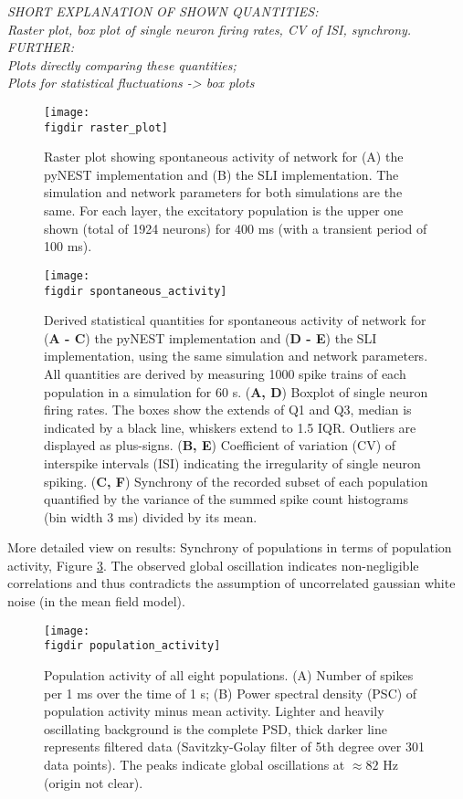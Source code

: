 \emph{SHORT EXPLANATION OF SHOWN QUANTITIES:\\
Raster plot, box plot of single neuron firing rates, CV of ISI, synchrony.\\
FURTHER: \\
Plots directly comparing these quantities;\\
Plots for statistical fluctuations -> box plots} 
\begin{figure}[htpb]
    \centering
    \texttt{[image: \\figdir raster\_plot]}
    \caption{Raster plot showing spontaneous activity of network for 
        (A) the pyNEST implementation and (B) the SLI implementation.
        The simulation and network parameters for both simulations are 
        the same. 
        For each layer, the excitatory population is the upper one shown 
        (total of 1924 neurons) for $400$ ms (with a transient period of 100 ms). 
    }
    \label{fig:raster_plot}
\end{figure}
\begin{figure}[htpb]
    \centering
    \texttt{[image: \\figdir spontaneous\_activity]}
    \caption{
        Derived statistical quantities for spontaneous activity of network for
        (\textbf{A - C}) the pyNEST implementation and (\textbf{D - E}) the SLI implementation, 
        using the same simulation and network parameters.
        All quantities are derived by measuring 1000 spike trains of
        each population in a simulation for 60 s. 
        \quad (\textbf{A, D}) Boxplot of single neuron firing rates. The boxes show the extends of 
        Q1 and Q3, median is indicated by a black line, whiskers extend to 1.5 IQR. 
        Outliers are displayed as plus-signs. 
        \quad (\textbf{B, E}) Coefficient of variation (CV) of interspike intervals (ISI) indicating 
        the irregularity of single neuron spiking. 
        \quad (\textbf{C, F}) Synchrony of the recorded subset of each population quantified by the 
        variance of the summed spike count histograms (bin width 3 ms) divided by
        its mean. 
    }
    \label{fig:spontaneous_activity}
\end{figure}

More detailed view on results:
Synchrony of populations in terms of population activity, Figure \ref{fig:population_activity}. 
The observed global oscillation indicates non-negligible correlations
and thus contradicts the assumption of uncorrelated gaussian white noise 
(in the mean field model).
\begin{figure}[htpb]
    \centering
    \texttt{[image: \\figdir population\_activity]}
    \caption{Population activity of all eight populations.
        (A) Number of spikes per 1 ms over the time of 1 s;
        (B) Power spectral density (PSC) of population activity minus mean activity. 
        Lighter and heavily oscillating background is the complete PSD, thick darker 
        line represents filtered data (Savitzky-Golay filter of 5th degree over 301 data points).
        The peaks indicate global oscillations at $\approx 82$ Hz (origin not clear).
    }
    \label{fig:population_activity}
\end{figure}



